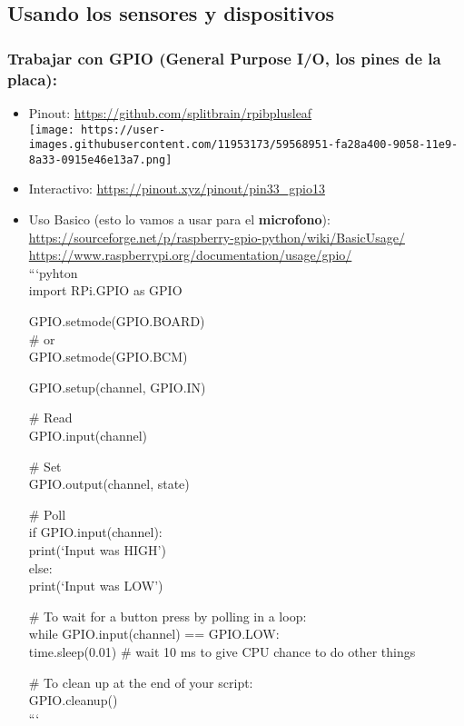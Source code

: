 \subsection{Usando los sensores y
dispositivos}\label{usando-los-sensores-y-dispositivos}

\subsubsection{Trabajar con \textbf{GPIO} (General Purpose I/O, los
pines de la
placa):}\label{trabajar-con-gpio-general-purpose-io-los-pines-de-la-placa}

\begin{itemize}
\item
  Pinout:
  \url{https://github.com/splitbrain/rpibplusleaf}\\\texttt{[image: https://user-images.githubusercontent.com/11953173/59568951-fa28a400-9058-11e9-8a33-0915e46e13a7.png]}\\
\item
  Interactivo: \url{https://pinout.xyz/pinout/pin33_gpio13}\\
\item
  Uso Basico (esto lo vamos a usar para el \textbf{microfono}):\\
  \url{https://sourceforge.net/p/raspberry-gpio-python/wiki/BasicUsage/}\\
  \url{https://www.raspberrypi.org/documentation/usage/gpio/}\\
  ```pyhton\\ import RPi.GPIO as GPIO

  GPIO.setmode(GPIO.BOARD)\\ \# or\\ GPIO.setmode(GPIO.BCM)

  GPIO.setup(channel, GPIO.IN)

  \# Read\\ GPIO.input(channel)

  \# Set\\ GPIO.output(channel, state)

  \# Poll\\ if GPIO.input(channel):\\ print(`Input was HIGH')\\ else:\\
  print(`Input was LOW')

  \# To wait for a button press by polling in a loop:\\ while
  GPIO.input(channel) == GPIO.LOW:\\ time.sleep(0.01) \# wait 10 ms to
  give CPU chance to do other things

  \# To clean up at the end of your script:\\ GPIO.cleanup()\\ ```
\end{itemize}

